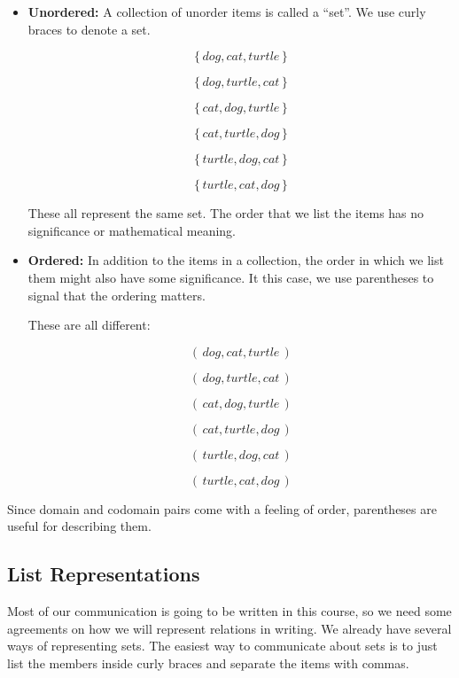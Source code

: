 \documentclass{ximera}
\begin{document}
\begin{itemize}
\item \textbf{\textcolor{blue!55!black}{Unordered:}}  A collection of unorder items is called a ``set''.  We use curly braces to denote a set.

\[  \{ \, dog, cat, turtle \, \}\]

\[ \{ \, dog, turtle, cat \, \} \]

\[ \{ \, cat, dog, turtle \, \} \]

\[ \{ \, cat, turtle, dog \, \} \]

\[ \{ \, turtle, dog, cat \, \} \]

\[ \{ \, turtle, cat, dog \, \} \]

These all represent the same set.  The order that we list the items has no significance or mathematical meaning.


\item \textbf{\textcolor{blue!55!black}{Ordered:}} In addition to the items in a collection, the order in which we list them might also have some significance.  It this case, we use parentheses to signal that the ordering matters.


These are all different:

\[ ( \, dog, cat, turtle \, ) \]

\[ ( \, dog, turtle, cat \, ) \]

\[ ( \, cat, dog, turtle \, ) \]

\[ ( \, cat, turtle, dog \, ) \]

\[ ( \, turtle, dog, cat \, ) \]

\[ ( \, turtle, cat, dog \, ) \]


\end{itemize}


Since domain and codomain pairs come with a feeling of order, parentheses are useful for describing them.  















\subsection*{List Representations}

Most of our communication is going to be written in this course, so we need some agreements on how we will represent relations in writing.  We already have several ways of representing sets.  The easiest way to communicate about sets is to just list the members inside curly braces and separate the items with commas.
\end{document}
